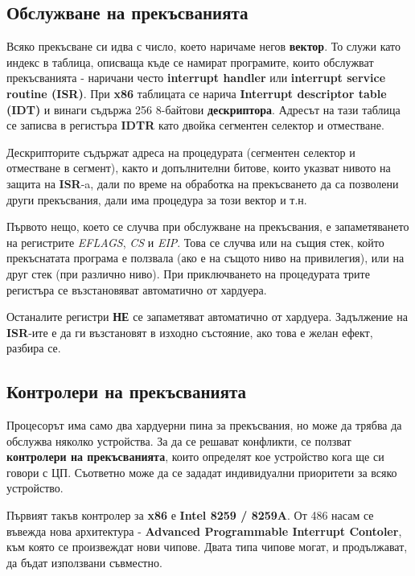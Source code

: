 \documentclass[fleqn,12pt]{article}
\begin{document}
\subsection{Обслужване на прекъсванията}
Всяко прекъсване си идва с число, което наричаме негов \textbf{вектор}. То служи като индекс в таблица, 
описваща къде се намират програмите, които обслужват прекъсванията - наричани често \textbf{interrupt handler}
или \textbf{interrupt service routine (ISR)}. При \textbf{x86} таблицата се нарича \textbf{Interrupt descriptor table (IDT)}
и винаги съдържа 256 8-байтови \textbf{дескриптора}. Адресът на тази таблица се записва в регистъра \textbf{IDTR} като двойка
сегментен селектор и отместване.

Дескрипторите съдържат адреса на процедурата (сегментен селектор и отместване в сегмент), както и допълнителни битове,
които указват нивото на защита на \textbf{ISR}-a, дали по време на обработка на прекъсването да са позволени други прекъсвания,
дали има процедура за този вектор и т.н.

Първото нещо, което се случва при обслужване на прекъсвания, е запаметяването на регистрите \textit{EFLAGS}, \textit{CS} и \textit{EIP}.
Това се случва или на същия стек, който прекъснатата програма е ползвала (ако е на същото ниво на привилегия), или на друг стек (при различно ниво).
При приключването на процедурата трите регистъра се възстановяват автоматично от хардуера.

Останалите регистри \textbf{НЕ} се запаметяват автоматично от хардуера. Задължение на \textbf{ISR}-ите е да ги възстановят в изходно състояние,
ако това е желан ефект, разбира се.  

\subsection{Контролери на прекъсванията}
Процесорът има само два хардуерни пина за прекъсвания, но може да трябва да обслужва няколко устройства.
За да се решават конфликти, се ползват \textbf{контролери на прекъсванията}, които определят кое 
устройство кога ще си говори с ЦП. Съответно може да се зададат индивидуални приоритети за всяко устройство.

Първият такъв контролер за \textbf{x86} е \textbf{Intel 8259 / 8259A}. От 486 насам се въвежда нова архитектура - 
\textbf{Advanced Programmable Interrupt Contoler}, към която се произвеждат нови чипове. Двата типа чипове
могат, и продължават, да бъдат използвани съвместно.
\end{document}

